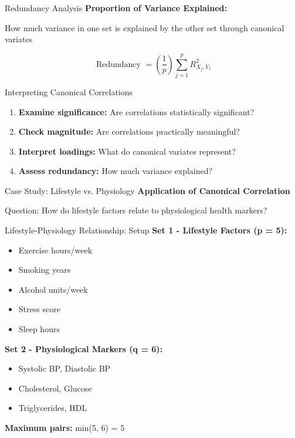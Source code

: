 \documentclass[aspectratio=169,ignorenonframetext]{beamer}
\begin{document}
\begin{frame}{Redundancy Analysis}
\textbf{Proportion of Variance Explained:}

How much variance in one set is explained by the other set through
canonical variates

\[\text{ Redundancy } = \left( \frac{1}{p} \right)\sum_{j = 1}^{p}R_{X_{j},V_{1}}^{2}\]
\end{frame}

\begin{frame}{Interpreting Canonical Correlations}
\begin{enumerate}
\item
  \textbf{Examine significance:} Are correlations statistically
  significant?
\item
  \textbf{Check magnitude:} Are correlations practically meaningful?
\item
  \textbf{Interpret loadings:} What do canonical variates represent?
\item
  \textbf{Assess redundancy:} How much variance explained?
\end{enumerate}
\end{frame}

\begin{frame}{Case Study: Lifestyle vs. Physiology}
\textbf{Application of Canonical Correlation}

Question: How do lifestyle factors relate to physiological health
markers?
\end{frame}

\begin{frame}[shrink]{Lifestyle-Physiology Relationship: Setup}
\textbf{Set 1 - Lifestyle Factors (p = 5):}

\begin{itemize}
\item
  Exercise hours/week
\item
  Smoking years
\item
  Alcohol units/week
\item
  Stress score
\item
  Sleep hours
\end{itemize}

\textbf{Set 2 - Physiological Markers (q = 6):}

\begin{itemize}
\item
  Systolic BP, Diastolic BP
\item
  Cholesterol, Glucose
\item
  Triglycerides, HDL
\end{itemize}

\textbf{Maximum pairs:} min(5, 6) = 5
\end{frame}
\end{document}
